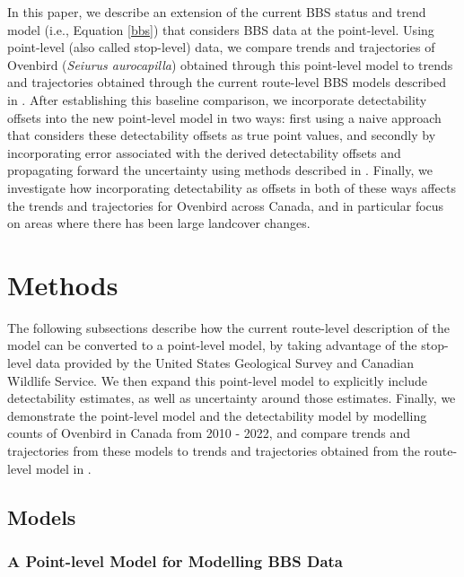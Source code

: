 \documentclass[12pt]{article}
\begin{document}
\par In this paper, we describe an extension of the current BBS status and trend model (i.e., Equation \ref{bbs}) that considers BBS data at the point-level. 
Using point-level (also called stop-level) data, we compare trends and trajectories of Ovenbird (\textit{Seiurus aurocapilla}) obtained through this point-level model to trends and trajectories obtained through the current route-level BBS models described in \citet{smith_spatially_2023}.
After establishing this baseline comparison, we incorporate detectability offsets into the new point-level model in two ways: first using a naive approach that considers these detectability offsets as true point values, and secondly by incorporating error associated with the derived detectability offsets and propagating forward the uncertainty using methods described in \citet{bravington_variance_2021}.
Finally, we investigate how incorporating detectability as offsets in both of these ways affects the trends and trajectories for Ovenbird across Canada, and in particular focus on areas where there has been large landcover changes.

\section{Methods}

\par The following subsections describe how the current route-level description of the model can be converted to a point-level model, by taking advantage of the stop-level data provided by the United States Geological Survey and Canadian Wildlife Service. 
We then expand this point-level model to explicitly include detectability estimates, as well as uncertainty around those estimates. 
Finally, we demonstrate the point-level model and the detectability model by modelling counts of Ovenbird in Canada from 2010 - 2022, and compare trends and trajectories from these models to trends and trajectories obtained from the route-level model in \citet{smith_spatially_2023}.

\subsection{Models}

\subsubsection{A Point-level Model for Modelling BBS Data}
\end{document}
